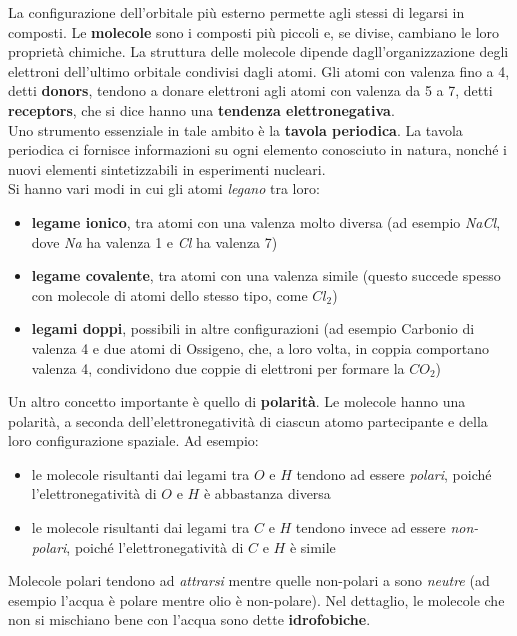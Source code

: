 \documentclass[a4paper,12pt, oneside]{book}
\begin{document}
La configurazione dell'orbitale più esterno permette agli stessi di legarsi in
composti. Le \textbf{molecole} sono i composti più piccoli e, se divise,
cambiano le loro proprietà chimiche. La struttura delle molecole dipende
dagll'organizzazione degli elettroni dell'ultimo orbitale condivisi dagli atomi.
Gli atomi con valenza fino a 4, detti \textbf{donors}, tendono a donare
elettroni agli atomi con valenza da 5 a 7, detti \textbf{receptors}, che si dice
hanno una \textbf{tendenza elettronegativa}. \\
Uno strumento essenziale in tale ambito è la \textbf{tavola periodica}. La
tavola periodica ci fornisce informazioni su ogni  elemento conosciuto in
natura, nonché i nuovi elementi sintetizzabili in esperimenti nucleari.\\
Si hanno vari modi in cui gli atomi \textit{legano} tra loro:
\begin{itemize}
  \item \textbf{legame ionico}, tra atomi con una valenza molto diversa (ad
  esempio \textit{NaCl}, dove \textit{Na} ha valenza 1 e \textit{Cl} ha valenza
  7)
  \item \textbf{legame covalente}, tra atomi con una valenza simile (questo
  succede spesso con molecole di atomi dello stesso tipo, come $Cl_2$)
  \item \textbf{legami doppi}, possibili in altre configurazioni (ad esempio
  Carbonio di valenza 4 e due atomi di Ossigeno, che, a loro volta, in coppia
  comportano valenza 4, condividono due coppie di
  elettroni per formare la $CO_2$)
\end{itemize}
Un altro concetto importante è quello di \textbf{polarità}. Le molecole hanno
una polarità, a seconda dell'elettronegatività di ciascun atomo partecipante e
della loro configurazione spaziale. Ad esempio:
\begin{itemize}
  \item le molecole risultanti dai legami tra $O$ e $H$ tendono ad essere
  \textit{polari}, poiché l'elettronegatività di $O$ e $H$ è abbastanza diversa 
  \item le molecole risultanti dai legami tra $C$ e $H$ tendono invece ad essere
  \textit{non-polari}, poiché l'elettronegatività di $C$ e $H$ è simile 
\end{itemize}
Molecole polari tendono ad \textit{attrarsi} mentre quelle non-polari a
sono \textit{neutre} (ad esempio l'acqua è polare mentre olio è non-polare). Nel
dettaglio, le molecole che non si mischiano bene con l'acqua sono dette
\textbf{idrofobiche}.\\
\end{document}
